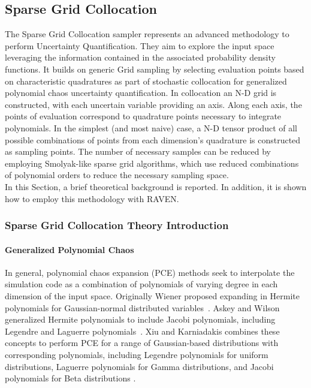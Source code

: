 
\subsection{Sparse Grid Collocation}
\label{sub:SGC}
The Sparse Grid Collocation sampler represents an advanced methodology to perform Uncertainty Quantification. They aim
to explore the input space leveraging the information contained in the associated probability density functions. It builds on generic Grid sampling by selecting evaluation points based on characteristic quadratures as part of stochastic collocation for generalized polynomial chaos uncertainty quantification. In collocation an N-D grid is constructed, with each uncertain variable providing an axis. Along each axis, the points of evaluation correspond to quadrature points necessary to integrate polynomials. In the simplest (and most naive) case, a N-D tensor product of all possible combinations of points from each dimension’s quadrature is constructed as sampling points. The number of necessary samples can be reduced by employing Smolyak-like sparse grid algorithms, which use reduced combinations of polynomial orders to reduce the necessary sampling space.
\\In this Section, a brief theoretical 
background is reported. In addition, it is shown how to employ this methodology with RAVEN.
\subsubsection{Sparse Grid Collocation Theory Introduction}
\label{subsub:SGctheory}
\paragraph{Generalized Polynomial Chaos}
In general, polynomial chaos expansion (PCE) methods seek to interpolate the simulation code as a combination of
polynomials of varying degree in each dimension of the input space.  Originally Wiener
proposed expanding in Hermite polynomials for Gaussian-normal distributed variables~\cite{wiener}.  Askey and
Wilson generalized Hermite polynomials to include Jacobi polynomials, including Legendre and Laguerre
polynomials~\cite{Wiener-Askey}.  Xiu and Karniadakis combines these concepts to perform PCE for a range of Gaussian-based
distributions with corresponding polynomials,
including Legendre polynomials for uniform distributions, Laguerre polynomials for Gamma distributions, and
Jacobi polynomials for Beta distributions \cite{xiu}.

